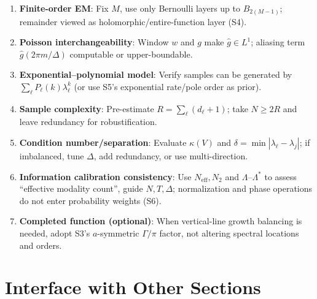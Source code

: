 \documentclass[11pt,a4paper]{article}
\theoremstyle{remark}
\begin{document}
\begin{enumerate}
\item \textbf{Finite-order EM}: Fix $M$, use only Bernoulli layers up to $B_{2(M-1)}$; remainder viewed as holomorphic/entire-function layer (S4).

\item \textbf{Poisson interchangeability}: Window $w$ and $g$ make $\widehat{g}\in L^1$; aliasing term $\widehat{g}(2\pi m/\Delta)$ computable or upper-boundable.

\item \textbf{Exponential--polynomial model}: Verify samples can be generated by $\sum_\ell P_\ell(k)\lambda_\ell^k$ (or use S5's exponential rate/pole order as prior).

\item \textbf{Sample complexity}: Pre-estimate $R=\sum_\ell(d_\ell+1)$; take $N\ge 2R$ and leave redundancy for robustification.

\item \textbf{Condition number/separation}: Evaluate $\kappa(V)$ and $\delta=\min|\lambda_\ell-\lambda_j|$; if imbalanced, tune $\Delta$, add redundancy, or use multi-direction.

\item \textbf{Information calibration consistency}: Use $N_{\mathrm{eff}},N_2$ and $\Lambda$--$\Lambda^\ast$ to assess ``effective modality count'', guide $N,T,\Delta$; normalization and phase operations do not enter probability weights (S6).

\item \textbf{Completed function (optional)}: When vertical-line growth balancing is needed, adopt S3's $a$-symmetric $\Gamma/\pi$ factor, not altering spectral locations and orders.
\end{enumerate}

\section{Interface with Other Sections}
\end{document}
